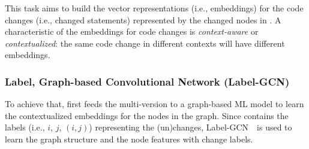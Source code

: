This task aims to build the vector representations (i.e.,
embeddings) for the code changes (i.e., changed statements)
represented by the changed nodes in {\mvpdg}. A characteristic of the
embeddings for code changes is {\em context-aware} or {\em
  contextualized}: the same code change in different contexts
will have different embeddings.

\subsubsection{{\bf Label, Graph-based Convolutional Network (Label-GCN)}}

To achieve that, {\tool} first feeds the multi-version {\mvpdg} to a
graph-based ML model to learn the contextualized
embeddings for the nodes in the graph. Since {\mvpdg} contains the
labels (i.e., $i$, $j$, $(i,j)$) representing the (un)changes,
Label-GCN~\cite{label-gcn}~is used to learn the graph structure and
the node features with change labels.




